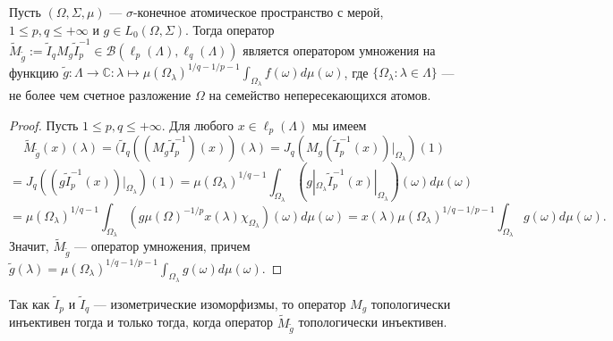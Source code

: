 \begin{proposition}\label{EquivMultOp} Пусть $(\Omega,\Sigma,\mu)$ ---
$\sigma$-конечное атомическое пространство с мерой, $1\leq p,q\leq +\infty$ и
$g\in L_0(\Omega,\Sigma)$. Тогда оператор
$\widetilde{M}_{\widetilde{g}}:=\widetilde{I}_q
M_g\widetilde{I}_p^{-1}\in\mathcal{B}(\ell_p(\Lambda),\ell_q(\Lambda))$ является
оператором умножения на функцию
$\widetilde{g}:\Lambda\to\mathbb{C}:\lambda\mapsto
{\mu(\Omega_\lambda)}^{1/q-1/p-1}\int_{\Omega_\lambda}f(\omega)d\mu(\omega)$, 
где $ \{\Omega_\lambda:\lambda\in\Lambda \}$ --- не более чем счетное разложение
$\Omega$ на семейство непересекающихся атомов.
\end{proposition}
\begin{proof} Пусть $1\leq p,q\leq +\infty$. Для любого $x\in\ell_p(\Lambda)$ мы
имеем
$$
\widetilde{M}_{\widetilde{g}}(x)(\lambda)
=(\widetilde{I}_q((M_g\widetilde{I}_p^{-1})(x))(\lambda)
=J_q(M_g(\widetilde{I}_p^{-1}(x))|_{\Omega_\lambda})(1)
$$
$$
=J_q((g \widetilde{I}_p^{-1}(x))|_{\Omega_\lambda})(1)
={\mu(\Omega_\lambda)}^{1/q-1}\int_{\Omega_\lambda}(g|_{\Omega_\lambda} 
\widetilde{I}_p^{-1}(x)|_{\Omega_\lambda})(\omega)d\mu(\omega)
$$
$$
={\mu(\Omega_\lambda)}^{1/q-1}
\int_{\Omega_\lambda}(
    g {\mu(\Omega)}^{-1/p}x(\lambda)\chi_{\Omega_{\lambda}}
)(\omega)d\mu(\omega)
=x(\lambda){\mu(\Omega_\lambda)}^{1/q-1/p-1}
\int_{\Omega_\lambda} g(\omega)d\mu(\omega).
$$
Значит, $\widetilde{M}_{\widetilde{g}}$ --- оператор умножения, причем
$\widetilde{g}(\lambda)
={\mu(\Omega_\lambda)}^{1/q-1/p-1}\int_{\Omega_\lambda} g(\omega)d\mu(\omega)$.
\end{proof}

Так как $\widetilde{I}_p$ и $\widetilde{I}_q$ --- изометрические изоморфизмы, то
оператор $M_g$ топологически инъективен тогда и только тогда, когда оператор
$\widetilde{M}_{\widetilde{g}}$ топологически инъективен. 

